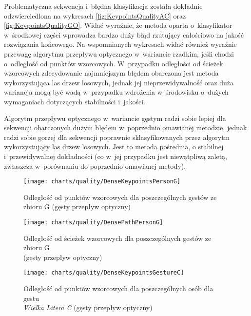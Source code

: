     Problematyczna sekwencja i~błędna klasyfikacja została dokładnie odzwierciedlona na wykresach \ref{fig:KeypointsQualityAC} oraz \ref{fig:KeypointsQualityGO}. Widać wyraźnie, że metoda oparta o~klasyfikator w~środkowej części wprowadza bardzo duży błąd rzutujący całościowo na jakość rozwiązania końcowego. Na wspomnianych wykresach widać również wyraźnie przewagę algorytmu przepływu optycznego w~wariancie rzadkim, jeśli chodzi o~odległość od punktów wzorcowych. W~przypadku odległości od ścieżek wzorcowych zdecydowanie najmniejszym błędem obarczona jest metoda wykorzystująca las drzew losowych, jednak jej nieprzewidywalność oraz duża wariancja mogą być wadą w~przypadku wdrożenia w~środowisku o~dużych wymaganiach dotyczących stabilności i~jakości.

    Algorytm przepływu optycznego w~wariancie gęstym radzi sobie lepiej dla sekwencji obarczonych dużym błędem w~poprzednio omawianej metodzie, jednak radzi sobie gorzej dla sekwencji poprawnie sklasyfikowanych przez algorytm wykorzystujący las drzew losowych. Jest to metoda pośrednia, o stabilnej i~przewidywalnej dokładności (co w~jej przypadku jest niewątpliwą zaletą, zwłaszcza w~porównaniu do poprzednio omawianej metody).

    \newpage
    \begin{figure}[!ht]
      \centering
      \texttt{[image: charts/quality/DenseKeypointsPersonG]}
      \caption[Odległość od punktów wzorcowych dla poszczególnych gestów]
              {Odległość od punktów wzorcowych dla poszczególnych gestów ze zbioru G (gęsty przepływ optyczny)}
      \label{fig:DenseKeypointsPersonG}
    \end{figure}

    \begin{figure}[!ht]
      \centering
      \texttt{[image: charts/quality/DensePathPersonG]}
      \caption[Odległość od ścieżek wzorcowych dla poszczególnych gestów]
              {Odległość od ścieżek wzorcowych dla poszczególnych gestów ze zbioru G\\(gęsty przepływ optyczny)}
      \label{fig:DensePathPersonG}
    \end{figure}

    \newpage
    \begin{figure}[!ht]
      \centering
      \texttt{[image: charts/quality/DenseKeypointsGestureC]}
      \caption[Odległość od punktów wzorcowych dla poszczególnych osób dla gestu C]
              {Odległość od punktów wzorcowych dla poszczególnych osób dla gestu\\\textit{Wielka Litera C} (gęsty przepływ optyczny)}
      \label{fig:DenseKeypointsGestureC}
    \end{figure}

